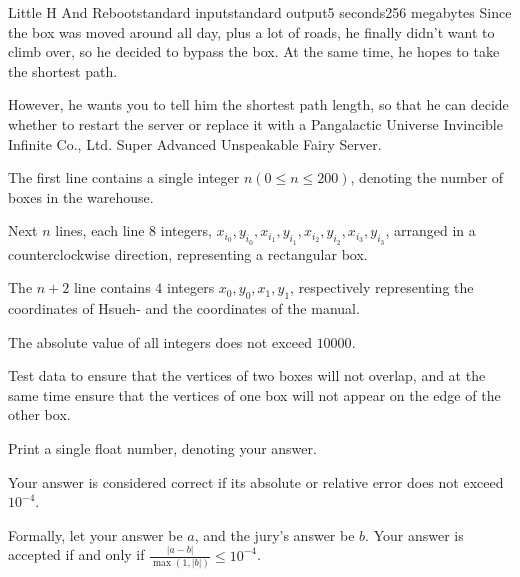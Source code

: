 \begin{problem}{Little H And Reboot}{standard input}{standard output}{5 seconds}{256 megabytes}
Since the box was moved around all day, plus a lot of roads, he finally didn't want to climb over, so he decided to bypass the box. At the same time, he hopes to take the shortest path.

However, he wants you to tell him the shortest path length, so that he can decide whether to restart the server or replace it with a Pangalactic Universe Invincible Infinite Co., Ltd. Super Advanced Unspeakable Fairy Server.



\InputFile
The first line contains a single integer $n(0 \leq n \leq 200)$, denoting the number of boxes in the warehouse.

Next $n$ lines, each line $8$ integers, $x_{i_0},y_{i_0},x_{i_1},y_{i_1},x_{i_2},y_{i_2},x_{i_3}, y_{i_3}$, arranged in a counterclockwise direction, representing a rectangular box.

The $n + 2$ line contains $4$ integers $x_0, y_0, x_1, y_1$, respectively representing the coordinates of Hsueh- and the coordinates of the manual.

The absolute value of all integers does not exceed $10000$.

Test data to ensure that the vertices of two boxes will not overlap, and at the same time ensure that the vertices of one box will not appear on the edge of the other box.


\OutputFile
Print a single float number, denoting your answer.

Your answer is considered correct if its absolute or relative error does not exceed $10^{-4}$.


Formally, let your answer be $a$, and the jury's answer be $b$. Your answer is accepted if and only if $\frac{|a - b|}{\max{(1, |b|)}} \le 10^{-4}$.



\Example

\begin{example}
%
\end{example}

\end{problem}

